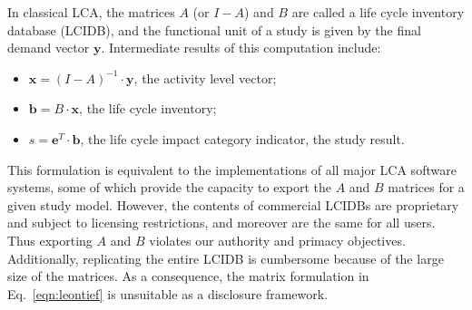 In classical LCA, the matrices $A$ (or $I-A$) and $B$ are called a life cycle inventory database (LCIDB), and the functional unit of a study is given by the final demand vector $\mathbf{y}$.  Intermediate results of this computation include:
\begin{itemize}
\item $\mathbf{x} = \left(I-A\right)^{-1}\cdot\mathbf{y}$, the activity level vector;
\item $\mathbf{b} = B\cdot\mathbf{x}$, the life cycle inventory;
\item $s = \mathbf{e}^T\cdot\mathbf{b}$, the life cycle impact category indicator, the study result.
\end{itemize}

This formulation is equivalent to the implementations of all major LCA software systems, some of which provide the capacity to export the $A$ and $B$ matrices for a given study model.  However, the contents of commercial LCIDBs are proprietary and subject to licensing restrictions, and moreover are the same for all users.  Thus exporting $A$ and $B$ violates our authority and primacy objectives.  Additionally, replicating the entire LCIDB is cumbersome because of the large size of the matrices.   As a consequence, the matrix formulation in Eq.~\ref{eqn:leontief} is unsuitable as a disclosure framework.
